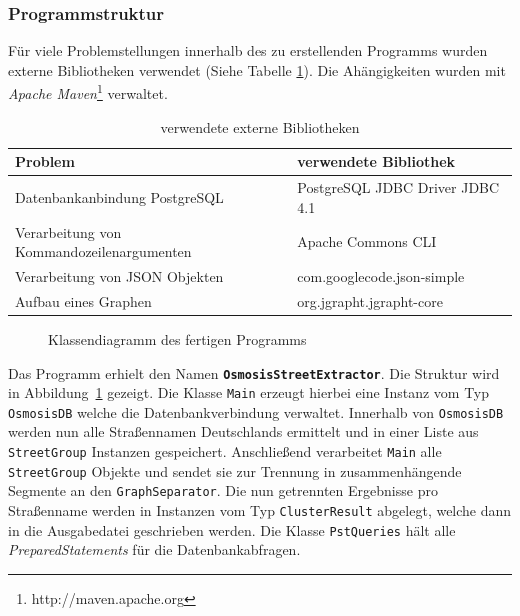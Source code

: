 \subsubsection{Programmstruktur}
Für viele Problemstellungen innerhalb des zu erstellenden Programms wurden externe Bibliotheken verwendet (Siehe Tabelle \ref{tab:OsmosisStreetExtractor:Libraries}).
Die Ahängigkeiten wurden mit \textit{Apache Maven}\footnote{http://maven.apache.org} verwaltet.
\begin{table}[htb]
\centering
\caption{verwendete externe Bibliotheken}
\label{tab:OsmosisStreetExtractor:Libraries}
\begin{tabular}{|l|l|}
\hline
\textbf{Problem}                          & \textbf{verwendete Bibliothek}     \\ \hline
Datenbankanbindung PostgreSQL             & PostgreSQL JDBC Driver JDBC 4.1    \\ \hline
Verarbeitung von Kommandozeilenargumenten & Apache Commons CLI                 \\ \hline
Verarbeitung von JSON Objekten            & com.googlecode.json-simple         \\ \hline
Aufbau eines Graphen                      & org.jgrapht.jgrapht-core           \\ \hline
\end{tabular}
\end{table}

\begin{figure}[htb]
   \centering
   \caption{Klassendiagramm des fertigen Programms}
   \label{fig:ose:uml}
 \end{figure}

Das Programm erhielt den Namen \textbf{\texttt{OsmosisStreetExtractor}}. Die Struktur wird in Abbildung~\ref{fig:ose:uml} gezeigt.
Die Klasse \texttt{Main} erzeugt hierbei eine Instanz vom Typ \texttt{OsmosisDB} welche die Datenbankverbindung verwaltet.
Innerhalb von \texttt{OsmosisDB} werden nun alle Straßennamen Deutschlands ermittelt und in einer Liste aus \texttt{StreetGroup} Instanzen gespeichert.
Anschließend verarbeitet \texttt{Main} alle \texttt{StreetGroup} Objekte und sendet sie zur Trennung in zusammenhängende Segmente an den \texttt{GraphSeparator}.
Die nun getrennten Ergebnisse pro Straßenname werden in Instanzen vom Typ \texttt{ClusterResult} abgelegt, welche dann in die Ausgabedatei geschrieben werden.
Die Klasse \texttt{PstQueries} hält alle \textit{PreparedStatements} für die Datenbankabfragen.

